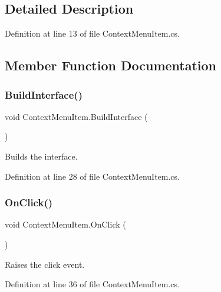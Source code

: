 \subsection{Detailed Description}


Definition at line 13 of file Context\+Menu\+Item.\+cs.



\subsection{Member Function Documentation}
\mbox{\label{class_context_menu_item_a50a1e4f7c621e30572957b800ae70531}} 
\subsubsection{\texorpdfstring{Build\+Interface()}{BuildInterface()}}
{\footnotesize\ttfamily void Context\+Menu\+Item.\+Build\+Interface (\begin{DoxyParamCaption}{ }\end{DoxyParamCaption})}



Builds the interface. 



Definition at line 28 of file Context\+Menu\+Item.\+cs.

\mbox{\label{class_context_menu_item_aa48a85e990263932bf3ddff68abd3535}} 
\subsubsection{\texorpdfstring{On\+Click()}{OnClick()}}
{\footnotesize\ttfamily void Context\+Menu\+Item.\+On\+Click (\begin{DoxyParamCaption}{ }\end{DoxyParamCaption})}



Raises the click event. 



Definition at line 36 of file Context\+Menu\+Item.\+cs.

\mbox{\label{class_context_menu_item_abcb3d57f1638161497eb6ff4f1f442e8}} 
